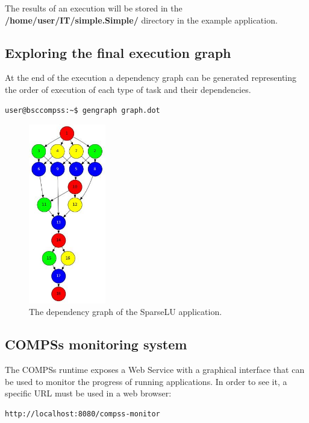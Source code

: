 The results of an execution will be stored in the {\bf /home/user/IT/simple.Simple/} directory in the example application.


\subsection{Exploring the final execution graph}
At the end of the execution a dependency graph can be generated representing the order of execution of each type of task and their dependencies.

\begin{lstlisting}[language=bash]
user@bsccompss:~$ gengraph graph.dot
\end{lstlisting}

\begin{figure}[h!]
  \centering
    \includegraphics[width=0.3\textwidth]{./Sections/3_Running_Apps/Figures/dependency_graph.jpeg}
    \caption{The dependency graph of the SparseLU application. \label{fig:dependency_graph}}
\end{figure}

\subsection{COMPSs monitoring system}
The COMPSs runtime exposes a Web Service with a graphical interface that can be used to monitor the progress of running applications. In order to see it, a specific URL must be used in a web browser:

\begin{lstlisting}[language=bash]
http://localhost:8080/compss-monitor
\end{lstlisting}

